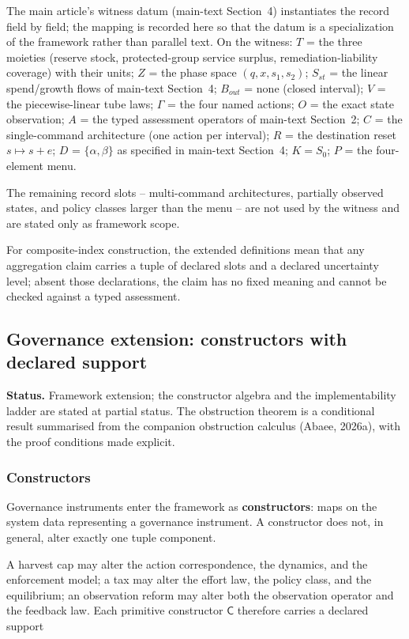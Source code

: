 \documentclass[preprint,11pt,authoryear]{elsarticle}
\theoremstyle{remark}
\begin{document}
The main article's witness datum (main-text Section~4) instantiates the record field by field; the mapping is recorded here so that the datum is a specialization of the framework rather than parallel text. On the witness: $T$ = the three moieties (reserve stock, protected-group service surplus, remediation-liability coverage) with their units; $Z$ = the phase space $(q, x, s_1, s_2)$; $S_{st}$ = the linear spend/growth flows of main-text Section~4; $B_{out}$ = none (closed interval); $V$ = the piecewise-linear tube laws; $\Gamma$ = the four named actions; $O$ = the exact state observation; $A$ = the typed assessment operators of main-text Section~2; $C$ = the single-command architecture (one action per interval); $R$ = the destination reset $s \mapsto s + e$; $D$ = $\{\alpha, \beta\}$ as specified in main-text Section~4; $K = S_0$; $P$ = the four-element menu.

The remaining record slots -- multi-command architectures, partially observed states, and policy classes larger than the menu -- are not used by the witness and are stated only as framework scope.

For composite-index construction, the extended definitions mean that any aggregation claim carries a tuple of declared slots and a declared uncertainty level; absent those declarations, the claim has no fixed meaning and cannot be checked against a typed assessment.

\subsection{Governance extension: constructors with declared support}

\noindent\textbf{Status.} Framework extension; the constructor algebra and the implementability ladder are stated at partial status. The obstruction theorem is a conditional result summarised from the companion obstruction calculus (Abaee, 2026a), with the proof conditions made explicit.

\subsubsection{Constructors}

Governance instruments enter the framework as \textbf{constructors}: maps on the system data representing a governance instrument. A constructor does not, in general, alter exactly one tuple component.

A harvest cap may alter the action correspondence, the dynamics, and the enforcement model; a tax may alter the effort law, the policy class, and the equilibrium; an observation reform may alter both the observation operator and the feedback law. Each primitive constructor $\mathsf{C}$ therefore carries a declared support
\end{document}

